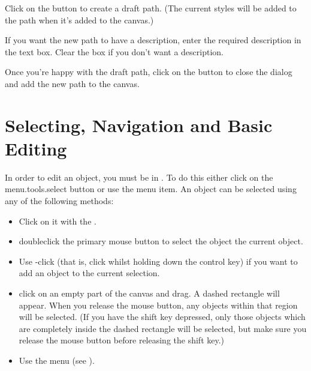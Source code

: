 Click on the  button to create a draft path. (The current
styles will be added to the path when it's added to the canvas.)


If you want the new path to have a description, enter the required 
description in the  text box.
Clear the box if you don't want a description.

Once you're happy with the draft path, click on the 
button to close the dialog and add the new \gls{path} to the \gls{canvas}.

\chapter{Selecting, Navigation and Basic Editing}\label{sec:selectobjects}


In order to edit an \gls{object}, you must be in \selectmode. To do
this either click on the \gls{menu.tools.select} button or use the 
 menu item. An \gls*{object} can
be selected using any of the following methods:
\begin{itemize}
\item Click on it with the .

\item \Gls{doubleclick} the primary mouse button to
select the \gls*{object}  the current \gls*{object}.

\item Use -click (that is, \gls{click} whilst holding down the control
 key) if you want to add an \gls*{object} to the current
selection.

\item \Gls{click} on an empty part of the \gls{canvas} and
drag. A dashed rectangle will appear. When you release the mouse
button, any \glspl*{object} within that
region will be selected. (If you have the shift  key depressed,
only those objects which are completely inside the dashed
rectangle will be selected, but make sure you release the mouse
button before releasing the shift key.)

\item Use the  menu (see ).

\end{itemize}

